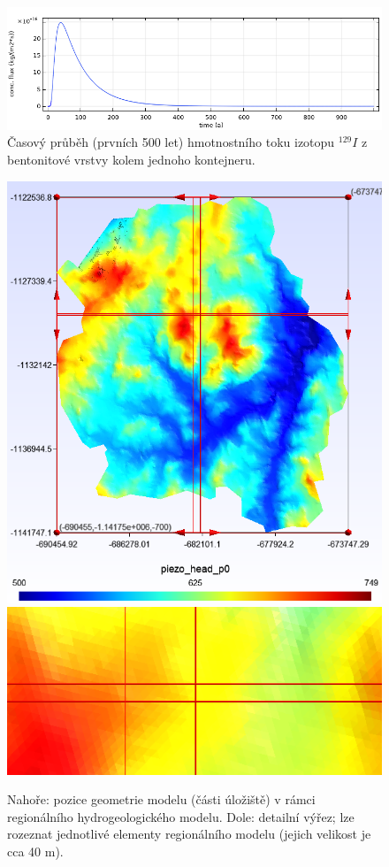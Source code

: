 \documentclass[11pt,a4paper]{article}
\begin{document}
\begin{onehalfspacing}
\begin{figure}[H]
\centering
\includegraphics[width=16cm]{graphics/obr_ralek/c_flux_jod.png}
\caption{Časový průběh (prvních 500 let) hmotnostního toku izotopu $^{129}I$ z bentonitové vrstvy kolem jednoho kontejneru.}
\label{flux_I}
\end{figure}

\begin{figure}[H]
\centering
\includegraphics[width=13.7cm]{graphics/obr_ralek/hradek_celek_2_uloziste.PNG}
\includegraphics[width=13.7cm]{graphics/obr_ralek/hradek_vyrez.PNG}
\caption{Nahoře: pozice geometrie modelu (části úložiště) v rámci regionálního hydrogeologického modelu. Dole: detailní výřez; lze rozeznat jednotlivé elementy regionálního modelu (jejich velikost je cca 40 m).}
\label{hradek_piezo_head_orez}
\end{figure}


\end{onehalfspacing}
\end{document}
